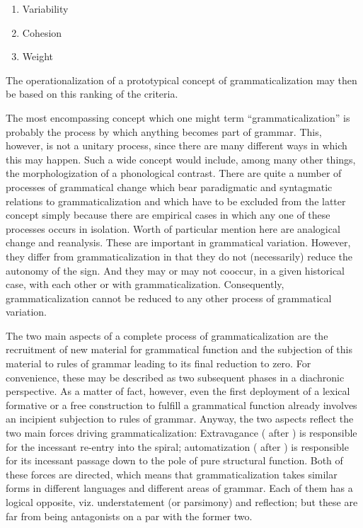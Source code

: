 \begin{enumerate}
\item Variability
\item Cohesion
\item Weight
\end{enumerate}

\noindent The operationalization of a prototypical concept of grammaticalization may then be based on this ranking of the criteria.

The most encompassing concept which one might term ``grammaticalization'' is probably the process by which anything becomes part of grammar. This, however, is not a unitary process, since there are many different ways in which this may happen. Such a wide concept would include, among many other things, the morphologization of a phonological contrast. There are quite a number of processes of grammatical change which bear paradigmatic and syntagmatic relations to grammaticalization and which have to be excluded from the latter concept simply because there are empirical cases in which any one of these processes occurs in isolation. Worth of particular mention here are analogical change and reanalysis. These are important in grammatical variation. However, they differ from grammaticalization in that they do not (necessarily) reduce the autonomy of the sign. And they may or may not cooccur, in a given historical case, with each other or with grammaticalization. Consequently, grammaticalization cannot be reduced to any other process of grammatical variation.

The two main aspects of a complete process of grammaticalization are the recruitment of new material for grammatical function and the subjection of this material to rules of grammar leading to its final reduction to zero. For convenience, these may be described as two subsequent phases in a diachronic perspective. As a matter of fact, however, even the first deployment of a lexical formative or a free construction to fulfill a grammatical function already involves an incipient subjection to rules of grammar. Anyway, the two aspects reflect the two main forces driving grammaticalization: Extravagance (\citealt{Haspelmath1999} after \citealt{Lehmann1975}) is responsible for the incessant re-entry into the spiral; automatization (\citealt{Lehmann2004} after \citealt{Givón1989}) is responsible for its incessant passage down to the pole of pure structural function. Both of these forces are directed, which means that grammaticalization takes similar forms in different languages and different areas of grammar. Each of them has a logical opposite, viz. understatement (or parsimony) and reflection; but these are far from being antagonists on a par with the former two.


